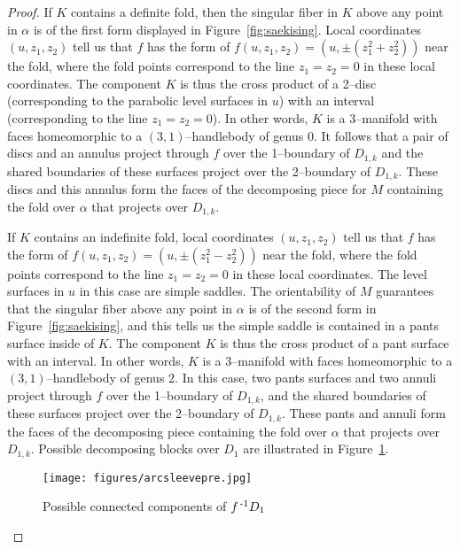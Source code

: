 \begin{proof}
	If $K$ contains a definite fold, then the singular fiber in $K$ above any point in $\alpha$ is of the first form displayed in Figure~\ref{fig:saekising}.
	Local coordinates $(u,z_1,z_2)$ tell us that $f$ has the form of $f(u,z_1,z_2)=(u,\pm(z_1^2+z_2^2))$ near the fold, where the fold points correspond to the line $z_1=z_2=0$ in these local coordinates.
	The component $K$ is thus the cross product of a 2--disc (corresponding to the parabolic level surfaces in $u$) with an interval (corresponding to the line $z_1=z_2=0$).
	In other words, $K$ is a 3--manifold with faces homeomorphic to a $(3,1)$--handlebody of genus 0.
	It follows that a pair of discs and an annulus project through $f$ over the 1--boundary of $D_{1,k}$ and the shared boundaries of these surfaces project over the 2--boundary of $D_{1,k}$.
	These discs and this annulus form the faces of the decomposing piece for $M$ containing the fold over $\alpha$ that projects over $D_{1,k}$.
	
	If $K$ contains an indefinite fold,
	local coordinates $(u,z_1,z_2)$ tell us that $f$ has the form of $f(u,z_1,z_2)=(u,\pm(z_1^2-z_2^2))$ near the fold, where the fold points correspond to the line $z_1=z_2=0$ in these local coordinates.
	The level surfaces in $u$ in this case are simple saddles.
	The orientability of $M$ guarantees that the singular fiber above any point in $\alpha$ is of the second form in Figure~\ref{fig:saekising}, and this tells us the simple saddle is contained in a pants surface inside of $K$.
	The component $K$ is thus the cross product of a pant surface with an interval.
	In other words, $K$ is a 3--manifold with faces homeomorphic to a $(3,1)$--handlebody of genus 2.
	In this case, two pants surfaces and two annuli project through $f$ over the 1--boundary of $D_{1,k}$, and the shared boundaries of these surfaces project over the 2--boundary of $D_{1,k}$.
	These pants and annuli form the faces of the decomposing piece containing the fold over $\alpha$ that projects over $D_{1,k}$.
	Possible decomposing blocks over $D_1$ are illustrated in Figure~\ref{fig:arcsleevepre}.
	
	\begin{figure}
		\centering
		\captionsetup{justification=centering}
		\caption{Possible connected components of  $f^{\,\text{-}1} D_1$}
		\texttt{[image: figures/arcsleevepre.jpg]}
		\label{fig:arcsleevepre}
	\end{figure}
		

\end{proof}
